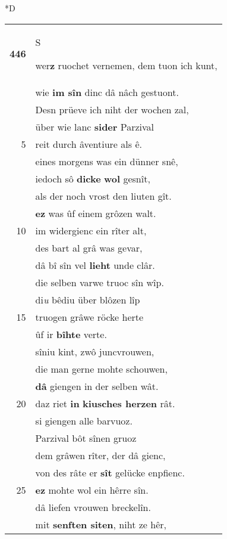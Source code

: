 \documentclass[8pt,a4paper,notitlepage]{article}
\begin{document}
\begin{table}[ht]
\begin{minipage}[t]{0.5\linewidth}
\small
\begin{center}*D
\end{center}
\begin{tabular}{rl}
\textbf{446} & \begin{large}S\end{large}wer\textbf{z} ruochet vernemen, dem tuon ich kunt,\\ 
 & wie \textbf{im sîn} dinc dâ nâch gestuont.\\ 
 & Desn prüeve ich niht der wochen zal,\\ 
 & über wie lanc \textbf{sider} Parzival\\ 
5 & reit durch âventiure als ê.\\ 
 & eines morgens was ein dünner snê,\\ 
 & iedoch sô \textbf{dicke} \textbf{wol} gesnît,\\ 
 & als der noch vrost den liuten gît.\\ 
 & \textbf{ez} was ûf einem grôzen walt.\\ 
10 & im widergienc ein rîter alt,\\ 
 & des bart al grâ was gevar,\\ 
 & dâ bî sîn vel \textbf{lieht} unde clâr.\\ 
 & die selben varwe truoc sîn wîp.\\ 
 & di\textit{u} bêdiu über blôzen lîp\\ 
15 & truogen grâwe röcke herte\\ 
 & ûf ir \textbf{bîhte} verte.\\ 
 & sîniu kint, zwô juncvrouwen,\\ 
 & die man gerne mohte schouwen,\\ 
 & \textbf{dâ} giengen in der selben wât.\\ 
20 & daz riet \textbf{in} \textbf{kiusches herzen} rât.\\ 
 & si giengen alle barvuoz.\\ 
 & Parzival bôt sînen gruoz\\ 
 & dem grâwen rîter, der dâ gienc,\\ 
 & von des râte er \textbf{sît} gelücke enpfienc.\\ 
25 & \textbf{ez} mohte wol ein hêrre sîn.\\ 
 & dâ liefen vrouwen breckelîn.\\ 
 & mit \textbf{senften siten}, niht ze hêr,\\ 

\end{tabular}
\end{minipage}
\end{table}
\end{document}
